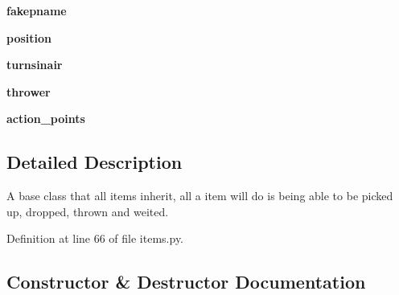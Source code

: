 \begin{DoxyCompactItemize}
\item 
\hypertarget{classitems_1_1_item_ad69ccf93a12e2f53fd7bd8fcf78bbf0f}{}{\bfseries fakepname}\label{classitems_1_1_item_ad69ccf93a12e2f53fd7bd8fcf78bbf0f}

\item 
\hypertarget{classitems_1_1_item_a843ebeb4fb099b4ee73db4c3f160fbde}{}{\bfseries position}\label{classitems_1_1_item_a843ebeb4fb099b4ee73db4c3f160fbde}

\item 
\hypertarget{classitems_1_1_item_a58c851c59019b4bd29ddae4fc2e7308a}{}{\bfseries turnsinair}\label{classitems_1_1_item_a58c851c59019b4bd29ddae4fc2e7308a}

\item 
\hypertarget{classitems_1_1_item_ac852d0cc081c6cc3b1c57696126eb398}{}{\bfseries thrower}\label{classitems_1_1_item_ac852d0cc081c6cc3b1c57696126eb398}

\item 
\hypertarget{classitems_1_1_item_ae2c4865fda252d5ef71ac4845ee09fd1}{}{\bfseries action\+\_\+points}\label{classitems_1_1_item_ae2c4865fda252d5ef71ac4845ee09fd1}

\end{DoxyCompactItemize}


\subsection{Detailed Description}
\begin{DoxyVerb}A base class that all items inherit, all a item will do is being able to be picked up, dropped, thrown and weited.
\end{DoxyVerb}
 

Definition at line 66 of file items.\+py.



\subsection{Constructor \& Destructor Documentation}
\hypertarget{classitems_1_1_item_ac5bafbc6f3051ff7612ece057be6875b}{}
